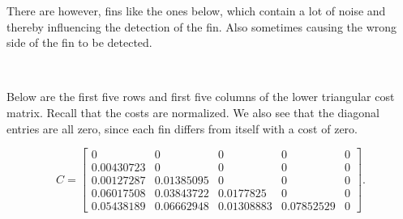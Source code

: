 \documentclass[a4paper,10pt]{article}
\begin{document}
There are however, fins like the ones below, which contain a lot of noise and thereby influencing the detection of the fin.  Also sometimes causing the
wrong side of the fin to be detected.

\begin{figure}[H]
\centering
\mbox{ \quad
{} \quad
{}}
\end{figure}

Below are the first five rows and first five columns of the lower triangular cost matrix.  Recall that the costs are normalized.
We also see that the diagonal entries are all zero, since each fin differs from itself with a cost of zero.

\[
 C = \begin{bmatrix*}
0 & 0 & 0 & 0 & 0 \\
0.00430723 & 0 & 0 & 0 & 0 \\
0.00127287 & 0.01385095 & 0 & 0 & 0 \\
0.06017508 & 0.03843722 & 0.0177825 & 0 & 0 \\
0.05438189 & 0.06662948 & 0.01308883 & 0.07852529 & 0
 \end{bmatrix*}.
\]
\end{document}
